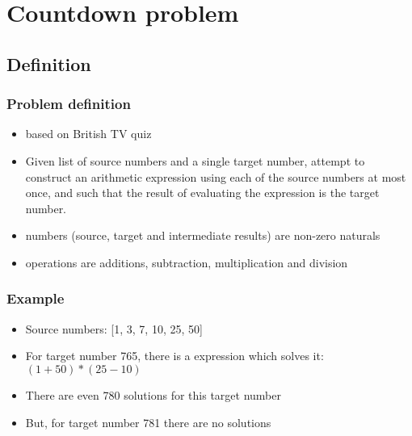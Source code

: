 \documentclass[aspectratio=43]{beamer}
\begin{document}




    
    
    
% 
%   
%   








\section{Countdown problem}

\subsection{Definition}

\begin{frame}
 \frametitle{Problem definition}
 \begin{itemize}
  \item based on British TV quiz
  \item Given list of source numbers and a single target number, attempt to construct an arithmetic expression using each of the source numbers at most once, and such that the result of evaluating the expression is the target number.
  \item numbers (source, target and intermediate results) are non-zero naturals
  \item operations are additions, subtraction, multiplication and division
 \end{itemize}
\end{frame}

\begin{frame}
 \frametitle{Example}
 \begin{itemize}
  \item Source numbers: [1, 3, 7, 10, 25, 50]
  \item For target number 765, there is a expression which solves it: $(1 + 50)*(25 - 10)$
  \item There are even 780 solutions for this target number
  \item But, for target number 781 there are no solutions
 \end{itemize}
\end{frame}
\end{document}
